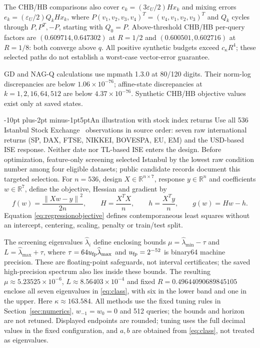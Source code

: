 \documentclass[pdflatex,sn-mathphys-num]{sn-jnl}
\makeatletter
\renewcommand\section{\@startsection{section}{1}{\z@}%
  {-10pt plus-2pt minus-1pt}{5pt}{\sectionfont}}
\theoremstyle{thmstyleone}
\theoremstyle{thmstyletwo}
\newcommand{\R}{\mathbb R}
\newcommand{\norm}[1]{\left\lVert #1\right\rVert}
\makeatother
\begin{document}
The CHB/HB comparisons also cover $e_k=(3\varepsilon_U/2)Hx_k$
and mixing errors $e_k=(\varepsilon_U/2)Q_kHx_k$, where
$P(v_1,v_2,v_3,v_4)^T=(v_4,v_1,v_2,v_3)^T$ and $Q_k$ cycles through $P,P^T,-P$, starting with $Q_0=P$.
Above-threshold CHB/HB per-query factors are $(0.609714,0.647302)$
at $R=1/2$ and $(0.600501,0.602716)$ at $R=1/8$: both converge
above $q$. All positive synthetic budgets exceed $c_\kappa R^4$;
these selected paths do not establish a worst-case vector-error guarantee.

GD and NAG-Q calculations use mpmath 1.3.0 at 80/120 digits.
Their norm-log discrepancies are below
$1.06\times10^{-76}$; affine-state discrepancies at $k=1,2,16,64,512$
are below $4.37\times10^{-76}$. Synthetic CHB/HB objective values
exist only at saved states.

\section{An illustration with stock index returns}\label{sec:istanbul}
Use all 536 Istanbul Stock Exchange~\cite{istanbul2013} observations in
source order: seven raw international returns (SP, DAX, FTSE, NIKKEI,
BOVESPA, EU, EM) and the USD-based ISE response. Neither date nor TL-based
ISE enters the design. Before optimization, feature-only screening selected
Istanbul by the lowest raw condition number among four eligible datasets;
public candidate records document this targeted selection.
For $n=536$, design $X\in\R^{n\times7}$, response $y\in\R^n$ and
coefficients $w\in\R^7$, define the objective, Hessian and gradient by
\begin{equation}\label{eq:regressionobjective}
 f(w)=\frac{\norm{Xw-y}^2}{2n},\qquad
 H=\frac{X^TX}{n},\qquad h=\frac{X^Ty}{n},\qquad g(w)=Hw-h.
\end{equation}
Equation \eqref{eq:regressionobjective} defines contemporaneous least squares
without an intercept, centering, scaling, penalty or train/test split.

The screening eigenvalues $\widehat\lambda_i$ define enclosing bounds
$\mu=\widehat\lambda_{\min}-\tau$ and
$L=\widehat\lambda_{\max}+\tau$, where
$\tau=64u_{\rm fp}\widehat\lambda_{\max}$ and $u_{\rm fp}=2^{-52}$
is binary64 machine precision. These are floating-point safeguards,
not interval certificates; the saved high-precision spectrum also lies
inside these bounds. The resulting $\mu\approx5.23525\times10^{-6}$,
$L\approx8.56403\times10^{-4}$ and fixed
$R=0.49644090689845105$ enclose all seven eigenvalues in
\eqref{eq:class}, with six in the lower band and one in the upper.
Here $\kappa\approx163.584$. All methods use the fixed tuning rules
in Section~\ref{sec:numerics}, $w_{-1}=w_0=0$ and 512 queries;
the bounds and horizon are not retuned. Displayed endpoints are rounded;
tuning uses the full decimal values in the fixed configuration, and
$a,b$ are obtained from \eqref{eq:class}, not treated as eigenvalues.
\end{document}
